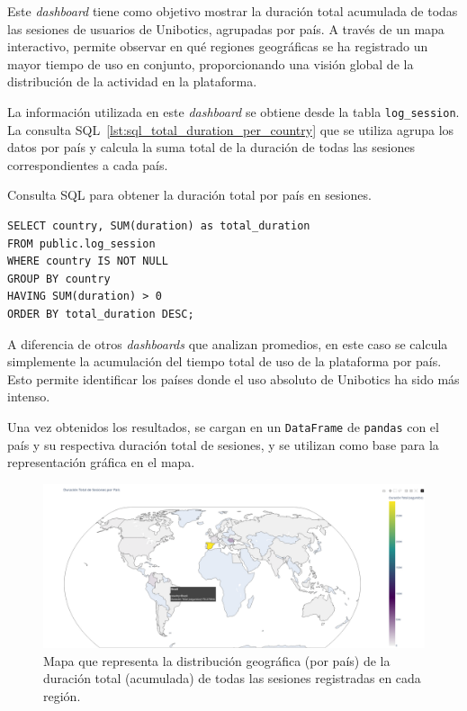 \documentclass[a4paper, 12pt]{book}
\begin{document}
Este \textit{dashboard} tiene como objetivo mostrar la duración total acumulada de todas las sesiones de usuarios de Unibotics, agrupadas por país. A través de un mapa interactivo, permite observar en qué regiones geográficas se ha registrado un mayor tiempo de uso en conjunto, proporcionando una visión global de la distribución de la actividad en la plataforma.

La información utilizada en este \textit{dashboard} se obtiene desde la tabla \texttt{log\_session}. La consulta SQL~\ref{lst:sql_total_duration_per_country} que se utiliza agrupa los datos por país y calcula la suma total de la duración de todas las sesiones correspondientes a cada país.

\begin{listing}[h!]
\caption{Consulta SQL para obtener la duración total por país en sesiones.}
\label{lst:sql_total_duration_per_country}
\begin{verbatim}
SELECT country, SUM(duration) as total_duration
FROM public.log_session
WHERE country IS NOT NULL
GROUP BY country
HAVING SUM(duration) > 0
ORDER BY total_duration DESC;
\end{verbatim}
\end{listing}

A diferencia de otros \textit{dashboards} que analizan promedios, en este caso se calcula simplemente la acumulación del tiempo total de uso de la plataforma por país. Esto permite identificar los países donde el uso absoluto de Unibotics ha sido más intenso.

Una vez obtenidos los resultados, se cargan en un \texttt{DataFrame} de \texttt{pandas} con el país y su respectiva duración total de sesiones, y se utilizan como base para la representación gráfica en el mapa.

\begin{figure}[H]
  \centering
  \includegraphics[width=1.1\textwidth]{img/2a.png}
  \caption{Mapa que representa la distribución geográfica (por país) de la duración total (acumulada) de todas las sesiones registradas en cada región.}
  \label{fig:2a}
\end{figure}
\end{document}
